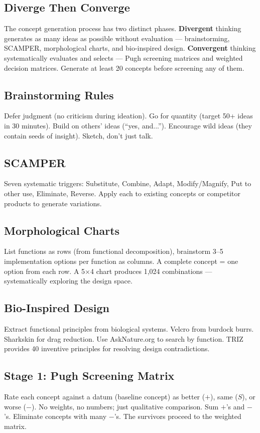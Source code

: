 \documentclass[11pt,letterpaper,twoside,openany]{book}
\begin{document}
\subsection{Diverge Then Converge}
The concept generation process has two distinct phases. \textbf{Divergent} thinking generates as many ideas as possible without evaluation — brainstorming, SCAMPER, morphological charts, and bio-inspired design. \textbf{Convergent} thinking systematically evaluates and selects — Pugh screening matrices and weighted decision matrices. Generate at least 20 concepts before screening any of them.

\subsection{Brainstorming Rules}
Defer judgment (no criticism during ideation). Go for quantity (target 50+ ideas in 30 minutes). Build on others' ideas (``yes, and...''). Encourage wild ideas (they contain seeds of insight). Sketch, don't just talk.

\subsection{SCAMPER}
Seven systematic triggers: Substitute, Combine, Adapt, Modify/Magnify, Put to other use, Eliminate, Reverse. Apply each to existing concepts or competitor products to generate variations.

\subsection{Morphological Charts}
List functions as rows (from functional decomposition), brainstorm 3--5 implementation options per function as columns. A complete concept = one option from each row. A 5$\times$4 chart produces 1,024 combinations — systematically exploring the design space.

\subsection{Bio-Inspired Design}
Extract functional principles from biological systems. Velcro from burdock burrs. Sharkskin for drag reduction. Use AskNature.org to search by function. TRIZ provides 40 inventive principles for resolving design contradictions.


\subsection{Stage 1: Pugh Screening Matrix}
Rate each concept against a datum (baseline concept) as better ($+$), same ($S$), or worse ($-$). No weights, no numbers; just qualitative comparison. Sum $+$'s and $-$'s. Eliminate concepts with many $-$'s. The survivors proceed to the weighted matrix.
\end{document}

